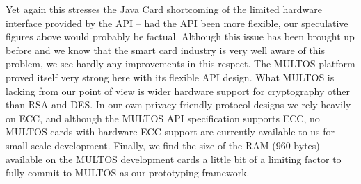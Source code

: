 Yet again this stresses the Java Card shortcoming of the limited
hardware interface provided by the API -- had the API been more
flexible, our speculative figures above would probably be factual.
Although this issue has been brought up before and we know
that the smart card industry is very well aware of this problem, we
see hardly any improvements in this respect. The MULTOS platform
proved itself very strong here with its flexible API design. What
MULTOS is lacking from our point of view is wider hardware support for
cryptography other than RSA and DES. In our own privacy-friendly protocol
designs we rely heavily on ECC, and although the MULTOS API
specification supports ECC, no MULTOS cards with hardware ECC support are
currently available to us for small scale development.
Finally, we find the size of the RAM
(960 bytes) available on the MULTOS development cards a little bit of
a limiting factor to fully commit to MULTOS as our prototyping
framework.